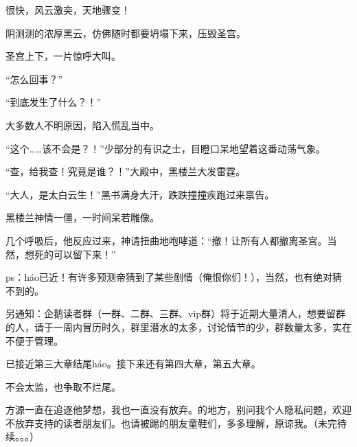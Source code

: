 \begin{this_body}
很快，风云激突，天地骤变！

阴测测的浓厚黑云，仿佛随时都要坍塌下来，压毁圣宫。

圣宫上下，一片惊呼大叫。

“怎么回事？”

“到底发生了什么？！”

大多数人不明原因，陷入慌乱当中。

“这个……该不会是？！”少部分的有识之士，目瞪口呆地望着这番动荡气象。

“查，给我查！究竟是谁？！”大殿中，黑楼兰大发雷霆。

“大人，是太白云生！”黑书满身大汗，跌跌撞撞疾跑过来禀告。

黑楼兰神情一僵，一时间呆若雕像。

几个呼吸后，他反应过来，神请扭曲地咆哮道：“撤！让所有人都撤离圣宫。当然，想死的可以留下来！”

ps：háo已近！有许多预测帝猜到了某些剧情（俺恨你们！），当然，也有绝对猜不到的。

另通知：企鹅读者群（一群、二群、三群、vip群）将于近期大量清人，想要留群的人，请于一周内冒历时久，群里潜水的太多，讨论情节的少，群数量太多，实在不便于管理。

已接近第三大章结尾háo。接下来还有第四大章，第五大章。

不会太监，也争取不烂尾。

方源一直在追逐他梦想，我也一直没有放弃。的地方，别问我个人隐私问题，欢迎不放弃支持的读者朋友们。也请被踢的朋友童鞋们，多多理解，原谅我。（未完待续。。。）

\end{this_body}

